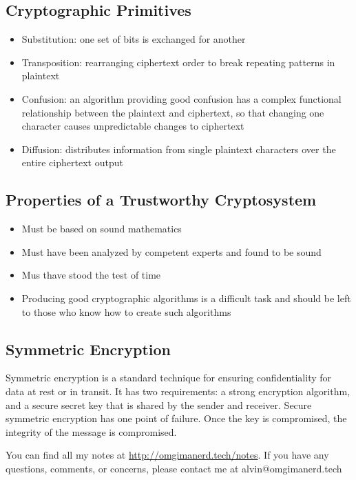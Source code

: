 \documentclass{math}
\begin{document}
\subsection*{Cryptographic Primitives}
\begin{itemize}
  \item Substitution: one set of bits is exchanged for another
  \item Transposition: rearranging ciphertext order to break repeating patterns
  in plaintext
  \item Confusion: an algorithm providing good confusion has a complex
  functional relationship between the plaintext and ciphertext, so that changing
  one character causes unpredictable changes to ciphertext
  \item Diffusion: distributes information from single plaintext characters over
  the entire ciphertext output
\end{itemize}

\subsection*{Properties of a Trustworthy Cryptosystem}
\begin{itemize}
  \item Must be based on sound mathematics
  \item Must have been analyzed by competent experts and found to be sound
  \item Mus thave stood the test of time
  \item Producing good cryptographic algorithms is a difficult task and
  should be left to those who know how to create such algorithms
\end{itemize}

\subsection*{Symmetric Encryption}
Symmetric encryption is a standard technique for ensuring confidentiality for
data at rest or in transit. It has two requirements: a strong encryption
algorithm, and a secure secret key that is shared by the sender and receiver.
Secure symmetric encryption has one point of failure. Once the key is
compromised, the integrity of the message is compromised.

\begin{center}
  You can find all my notes at \url{http://omgimanerd.tech/notes}. If you have
  any questions, comments, or concerns, please contact me at
  alvin@omgimanerd.tech
\end{center}
\end{document}
